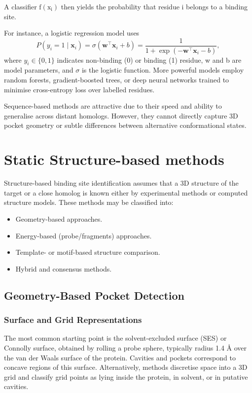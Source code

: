 \documentclass[12pt]{article}
\begin{document}
A classifier $\textrm{f}(\textrm{x}_\textrm{i})$ then yields the probability that residue i belongs to a binding site.

For instance, a logistic regression model uses
\begin{equation}
P(y_i = 1 \mid \mathbf{x}_i) = \sigma(\mathbf{w}^\top \mathbf{x}_i + b) = \frac{1}{1 + \exp(-\mathbf{w}^\top \mathbf{x}_i - b)},
\label{eq:logistic_regression}
\end{equation}
where $y_i \in \{0,1\}$ indicates non-binding (0) or binding (1) residue, w and b are model parameters, and $\sigma$ is the logistic function. More powerful models employ random forests, gradient-boosted trees, or deep neural networks trained to minimise cross-entropy loss over labelled residues.

Sequence-based methods are attractive due to their speed and ability to generalise across distant homologs. However, they cannot directly capture 3D pocket geometry or subtle differences between alternative conformational states.\cite{CH5_ghersi2011beyond,CH5_zhao2020exploring}

\section{Static Structure-based methods}

Structure-based binding site identification assumes that a 3D structure of the target or a close homolog is known either by experimental methods or computed structure models. These methods may be classified into:
\begin{itemize}
    \item Geometry-based approaches.
    \item Energy-based (probe/fragments) approaches.
    \item Template- or motif-based structure comparison.
    \item Hybrid and consensus methods.
\end{itemize}

\subsection{Geometry-Based Pocket Detection}

\subsubsection{Surface and Grid Representations}

The most common starting point is the solvent-excluded surface (SES) or Connolly surface, obtained by rolling a probe sphere, typically radius 1.4 \r{A} over the van der Waals surface of the protein. Cavities and pockets correspond to concave regions of this surface. Alternatively, methods discretise space into a 3D grid and classify grid points as lying inside the protein, in solvent, or in putative cavities\cite{CH5_LeGuilloux2009,CH5_zhao2020exploring}.
\end{document}
